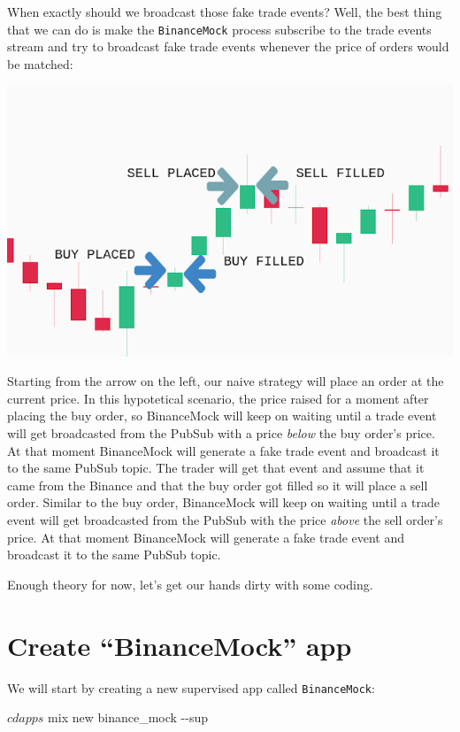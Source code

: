 \documentclass[
  oneside]{book}
\newenvironment{Shaded}{\begin{snugshade}}{\end{snugshade}}
\newcommand{\AttributeTok}[1]{\textcolor[rgb]{0.13,0.29,0.53}{#1}}
\newcommand{\ExtensionTok}[1]{#1}
\newcommand{\NormalTok}[1]{#1}
\begin{document}
\newpage

When exactly should we broadcast those fake trade events? Well, the best thing
that we can do is make the \texttt{BinanceMock} process subscribe to the trade events stream and try to broadcast fake trade events whenever the price of orders would be matched:

\begin{center}\includegraphics[width=0.7\linewidth]{images/chapter_04_04_explenation} \end{center}

Starting from the arrow on the left, our naive strategy will place an order at the current price.
In this hypotetical scenario, the price raised for a moment after placing the buy order, so BinanceMock will keep on waiting until a trade event will get broadcasted from the PubSub with a price \emph{below} the buy order's price. At that moment BinanceMock will generate a fake trade event and broadcast it to the same PubSub topic.
The trader will get that event and assume that it came from the Binance and that the buy order got filled so it will place a sell order.
Similar to the buy order, BinanceMock will keep on waiting until a trade event will get broadcasted from the PubSub with the price \emph{above} the sell order's price. At that moment BinanceMock will generate a fake trade event and broadcast it to the same PubSub topic.

Enough theory for now, let's get our hands dirty with some coding.

\section{Create ``BinanceMock'' app}\label{create-binancemock-app}

We will start by creating a new supervised app called \texttt{BinanceMock}:

\begin{Shaded}
\begin{Highlighting}[]
\ExtensionTok{$}\NormalTok{ cd apps}
\ExtensionTok{$}\NormalTok{ mix new binance\_mock }\AttributeTok{{-}{-}sup}
\end{Highlighting}
\end{Shaded}
\end{document}
